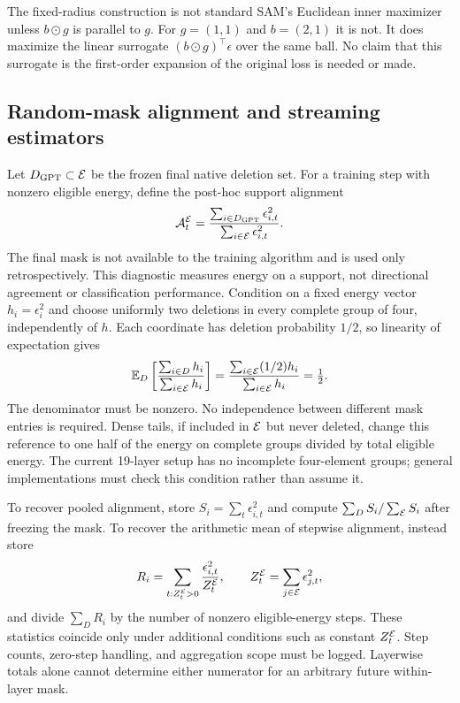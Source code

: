 The fixed-radius construction is not standard SAM's Euclidean inner maximizer unless $b\odot g$ is parallel to $g$. For $g=(1,1)$ and $b=(2,1)$ it is not. It does maximize the linear surrogate $(b\odot g)^\top\epsilon$ over the same ball. No claim that this surrogate is the first-order expansion of the original loss is needed or made.

\subsection{Random-mask alignment and streaming estimators}
Let $D_{\rm GPT}\subset\mathcal{E}$ be the frozen final native deletion set. For a training step with nonzero eligible energy, define the post-hoc support alignment
\begin{equation}
 \mathcal A_t^{\mathcal{E}}=\frac{\sum_{i\in D_{\rm GPT}}\epsilon_{i,t}^2}{\sum_{i\in\mathcal{E}}\epsilon_{i,t}^2}.
 \label{eq:align}
\end{equation}
The final mask is not available to the training algorithm and is used only retrospectively. This diagnostic measures energy on a support, not directional agreement or classification performance.
Condition on a fixed energy vector $h_i=\epsilon_i^2$ and choose uniformly two deletions in every complete group of four, independently of $h$. Each coordinate has deletion probability $1/2$, so linearity of expectation gives
\begin{equation}
 \mathbb E_D\left[\frac{\sum_{i\in D}h_i}{\sum_{i\in\mathcal{E}}h_i}\right]
 =\frac{\sum_{i\in\mathcal{E}}(1/2)h_i}{\sum_{i\in\mathcal{E}}h_i}=\tfrac12.
\end{equation}
The denominator must be nonzero. No independence between different mask entries is required. Dense tails, if included in $\mathcal{E}$ but never deleted, change this reference to one half of the energy on complete groups divided by total eligible energy. The current 19-layer setup has no incomplete four-element groups; general implementations must check this condition rather than assume it.

To recover pooled alignment, store $S_i=\sum_t\epsilon_{i,t}^2$ and compute $\sum_{D}S_i/\sum_{\mathcal{E}} S_i$ after freezing the mask. To recover the arithmetic mean of stepwise alignment, instead store
\begin{equation}
 R_i=\sum_{t:Z_t^{\mathcal{E}}>0}\frac{\epsilon_{i,t}^2}{Z_t^{\mathcal{E}}},\qquad
 Z_t^{\mathcal{E}}=\sum_{j\in\mathcal{E}}\epsilon_{j,t}^2,
\end{equation}
and divide $\sum_D R_i$ by the number of nonzero eligible-energy steps. These statistics coincide only under additional conditions such as constant $Z_t^{\mathcal{E}}$. Step counts, zero-step handling, and aggregation scope must be logged. Layerwise totals alone cannot determine either numerator for an arbitrary future within-layer mask.

